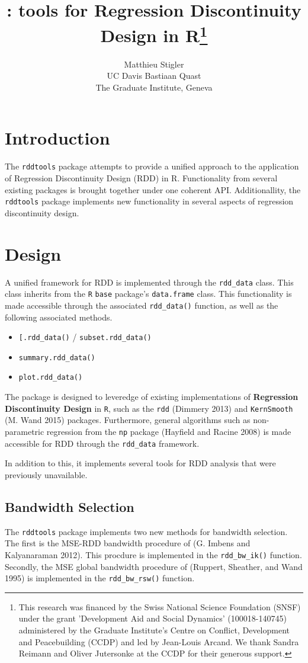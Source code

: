 \documentclass[article]{jss}
\author{
Matthieu Stigler\\UC Davis \And Bastiaan Quast\\The Graduate Institute, Geneva
}
\title{\pkg{rddtools}: tools for Regression Discontinuity Design in
R\thanks{This research was financed by the Swiss National Science Foundation (SNSF) under the grant 'Development Aid and Social Dynamics' (100018-140745) administered by the Graduate Institute's Centre on Conflict, Development and Peacebuilding (CCDP) and led by Jean-Louis Arcand. We thank Sandra Reimann and Oliver Jutersonke at the CCDP for their generous support.}}
\begin{document}
\section{Introduction}\label{introduction}

The \texttt{rddtools} package attempts to provide a unified approach to
the application of Regression Discontinuity Design (RDD) in R.
Functionality from several existing packages is brought together under
one coherent API. Additionallity, the \texttt{rddtools} package
implements new functionality in several aspects of regression
discontinuity design.

\section{Design}\label{design}

A unified framework for RDD is implemented through the
\texttt{rdd\_data} class. This class inherits from the \texttt{R}
\texttt{base} package's \texttt{data.frame} class. This functionality is
made accessible through the associated \texttt{rdd\_data()} function, as
well as the following associated methods.

\begin{itemize}
\itemsep1pt\parskip0pt
\item
  \texttt{{[}.rdd\_data()} / \texttt{subset.rdd\_data()}
\item
  \texttt{summary.rdd\_data()}
\item
  \texttt{plot.rdd\_data()}
\end{itemize}

The package is designed to leveredge of existing implementations of
\textbf{Regression Discontinuity Design} in \texttt{R}, such as the
\texttt{rdd} (Dimmery 2013) and \texttt{KernSmooth} (M. Wand 2015)
packages. Furthermore, general algorithms such as non-parametric
regression from the \texttt{np} package (Hayfield and Racine 2008) is
made accessible for RDD through the \texttt{rdd\_data} framework.

In addition to this, it implements several tools for RDD analysis that
were previously unavailable.

\subsection{Bandwidth Selection}\label{bandwidth-selection}

The \texttt{rddtools} package implements two new methods for bandwidth
selection. The first is the MSE-RDD bandwidth procedure of (G. Imbens
and Kalyanaraman 2012). This procdure is implemented in the
\texttt{rdd\_bw\_ik()} function. Secondly, the MSE global bandwidth
procedure of (Ruppert, Sheather, and Wand 1995) is implemented in the
\texttt{rdd\_bw\_rsw()} function.
\end{document}
